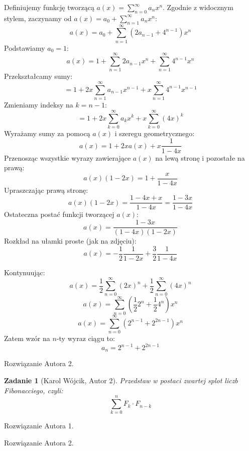 \documentclass{mwart}
\newtheorem{zad}{Zadanie}[section]
\begin{document}
\begin{mdframed}
    Definiujemy funkcję tworzącą $a(x) = \sum_{n=0}^{\infty} a_n x^n$.
    Zgodnie z widocznym stylem, zaczynamy od $a(x) = a_0 + \sum_{n=1}^{\infty} a_n x^n$:
    $$ a(x) = a_0 + \sum_{n=1}^{\infty} (2a_{n-1} + 4^{n-1}) x^n $$
    Podstawiamy $a_0 = 1$:
    $$ a(x) = 1 + \sum_{n=1}^{\infty} 2a_{n-1} x^n + \sum_{n=1}^{\infty} 4^{n-1} x^n $$
    Przekształcamy sumy:
    $$ = 1 + 2x \sum_{n=1}^{\infty} a_{n-1} x^{n-1} + x \sum_{n=1}^{\infty} 4^{n-1} x^{n-1} $$
    Zmieniamy indeksy na $k=n-1$:
    $$ = 1 + 2x \sum_{k=0}^{\infty} a_k x^k + x \sum_{k=0}^{\infty} (4x)^k $$
    Wyrażamy sumy za pomocą $a(x)$ i szeregu geometrycznego:
    $$ a(x) = 1 + 2x a(x) + x \frac{1}{1-4x} $$
    Przenosząc wszystkie wyrazy zawierające $a(x)$ na lewą stronę i pozostałe na prawą:
    $$ a(x) (1 - 2x) = 1 + \frac{x}{1-4x} $$
    Upraszczając prawą stronę:
    $$ a(x) (1 - 2x) = \frac{1-4x+x}{1-4x} = \frac{1-3x}{1-4x} $$
    Ostateczna postać funkcji tworzącej $a(x)$:
    $$ a(x) = \frac{1-3x}{(1-4x)(1-2x)} $$
    Rozkład na ułamki proste (jak na zdjęciu):
    $$ a(x) = -\frac{1}{2} \frac{1}{1-2x} + \frac{3}{2} \frac{1}{1-4x} $$

    Kontynuując:
    $$ a(x) = \frac{1}{2} \sum_{n=0}^{\infty} (2x)^n + \frac{1}{2} \sum_{n=0}^{\infty} (4x)^n $$
    $$ a(x) = \sum_{n=0}^{\infty} \left( \frac{1}{2} 2^n + \frac{1}{2} 4^n \right) x^n $$
    $$ a(x) = \sum_{n=0}^{\infty} (2^{n-1} + 2^{2n-1}) x^n $$
    Zatem wzór na $n$-ty wyraz ciągu to:
    $$ a_n = 2^{n-1} + 2^{2n-1} $$
\end{mdframed}
\begin{mdframed}
    Rozwiązanie Autora 2.
\end{mdframed}

\begin{zad}[Karol Wójcik, Autor 2]
    Przedstaw w postaci zwartej splot liczb Fibonacciego, czyli:
    \[\sum_{k=0}^{n}F_k\cdot F_{n-k}\]
\end{zad}
\begin{mdframed}
    Rozwiązanie Autora 1.
\end{mdframed}
\begin{mdframed}
    Rozwiązanie Autora 2.
\end{mdframed}
\end{document}
